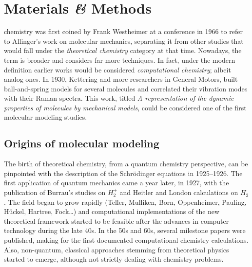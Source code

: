 

\chapter{Materials \textit{\&} Methods}
\label{chap:02}

 chemistry was first coined by Frank Westheimer at a conference in 1966 to refer to Allinger's work on molecular mechanics,\cite{Lipkowitz_2000} separating it from other studies that would fall under the \textit{theoretical chemistry} category at that time. Nowadays, the term is broader and considers far more techniques. In fact, under the modern definition earlier works would be considered \textit{computational chemistry}; albeit analog ones. In 1930, Kettering and more researchers in General Motors, built ball-and-spring models for several molecules and correlated their vibration modes with their Raman spectra. This work, titled \textit{A representation of the dynamic properties of molecules by mechanical models},\cite{kettering1930} could be considered one of the first molecular modeling studies.

\section{Origins of molecular modeling}
The birth of theoretical chemistry, from a quantum chemistry perspective, can be pinpointed with the description of the Schrödinger equations in 1925--1926.\cite{schrodinger} The first application of quantum mechanics came a year later, in 1927, with the publication of Burrau's studies\cite{burrau1927} on $H_{2}^{+}$ and Heitler and London calculations\cite{heitlerlondon} on $H_{2}$. The field began to grow rapidly (Teller,\cite{teller1930hydrogen} Mulliken,\cite{mulliken} Born,\cite{born} Oppenheimer,\cite{Oppenheimer} Pauling,\cite{pauling} Hückel,\cite{huckel} Hartree,\cite{hartree} Fock\cite{fock}\ldots) and computational implementations of the new theoretical framework started to be feasible after the advances in computer technology during the late 40s.\cite{chistory1940} In the 50s and 60s, several milestone papers were published, making for the first documented computational chemistry calculations.\cite{bolcer2007,ccl} Also, non-quantum, classical approaches stemming from theoretical physics started to emerge, although not strictly dealing with chemistry problems.\cite{Alder1959,Gibson1960,Rahman1964}

